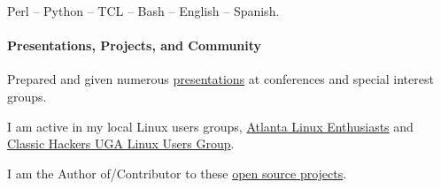 \documentclass[fontsize=11pt]{scrartcl}
\begin{document}
  Perl -- Python -- TCL -- Bash -- English -- Spanish.

  \paragraph{Presentations, Projects, and
    Community}\label{presentations-projects-and-community}

  Prepared and given numerous
  \href{http://presentation.goozbach.com/}{presentations} at conferences
  and special interest groups.

  I am active in my local Linux users groups,
  \href{http://ale.org/}{Atlanta Linux Enthusiasts} and
  \href{http://chugalug.uga.edu/}{Classic Hackers UGA Linux Users Group}.

  I am the Author of/Contributor to these
  \href{http://github.com/goozbach/}{open source projects}.
\end{document}
